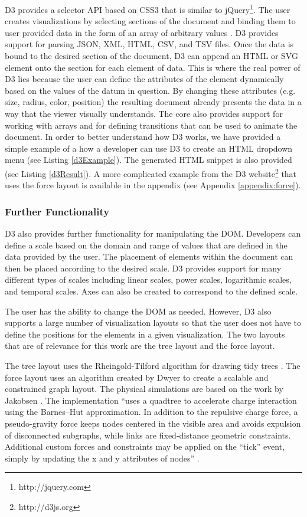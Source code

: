 D3 provides a selector API based on CSS3 that is similar to jQuery\footnote{http://jquery.com}. The user creates visualizations by selecting sections of the document and binding them to user provided data in the form of an array of arbitrary values \cite{2011-d3}. D3 provides support for parsing JSON, XML, HTML, CSV, and TSV files. Once the data is bound to the desired section of the document, D3 can append an HTML or SVG element onto the section for each element of data. This is where the real power of D3 lies because the user can define the attributes of the element dynamically based on the values of the datum in question. By changing these attributes (e.g. size, radius, color, position) the resulting document already presents the data in a way that the viewer visually understands. The core also provides support for working with arrays and for defining transitions that can be used to animate the document. In order to better understand how D3 works, we have provided a simple example of a how a developer can use D3 to create an HTML dropdown menu (see Listing \ref{d3Example}). The generated HTML snippet is also provided (see Listing \ref{d3Result}). A more complicated example from the D3 website\footnote{http://d3js.org} that uses the force layout is available in the appendix (see Appendix \ref{appendix:force}).

\subsubsection{Further Functionality}

D3 also provides further functionality for manipulating the DOM. Developers can define a scale based on the domain and range of values that are defined in the data provided by the user. The placement of elements within the document can then be placed according to the desired scale. D3 provides support for many different types of scales including linear scales, power scales, logarithmic scales, and temporal scales. Axes can also be created to correspond to the defined scale.

The user has the ability to change the DOM as needed. However, D3 also supports a large number of visualization layouts so that the user does not have to define the positions for the elements in a given visualization. The two layouts that are of relevance for this work are the tree layout and the force layout.

The tree layout uses the Rheingold-Tilford algorithm for drawing tidy trees \cite{Reingold81}. The force layout uses an algorithm created by Dwyer \cite{Dwyer2009} to create a scalable and constrained graph layout. The physical simulations are based on the work by Jakobsen \cite{Jakobsen03}. The implementation ``uses a quadtree to accelerate charge interaction using the Barnes–Hut approximation. In addition to the repulsive charge force, a pseudo-gravity force keeps nodes centered in the visible area and avoids expulsion of disconnected subgraphs, while links are fixed-distance geometric constraints. Additional custom forces and constraints may be applied on the ``tick'' event, simply by updating the x and y attributes of nodes'' \cite{D3Wiki}.

